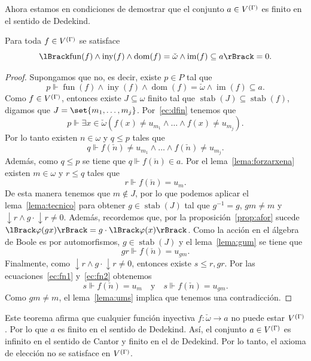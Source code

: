 \documentclass[letterpaper,DIV=15,12pt]{scrartcl}
\DeclarePairedDelimiter{\vb}{\lBrack}{\rBrack}             %
\DeclareMathOperator{\dom}{dom}                            %
\DeclareMathOperator{\im}{im}                              %
\DeclareMathOperator{\stab}{stab}                          %
\DeclareMathOperator{\abajo}{\downarrow}                   %
\DeclareMathOperator{\fun}{fun}                            %
\DeclareMathOperator{\iny}{iny}                            %
\begin{document}
Ahora estamos en condiciones de demostrar que el conjunto \(a\in\mg\) es finito
en el sentido de Dedekind.

\begin{theorem}
    Para toda \(f\in\mg\) se satisface
    \begin{equation*}
        \vb{\fun(f)\land\iny(f)\land\dom(f)=\check{\omega}\land\im(f)\subseteq a}=0.
    \end{equation*}
\end{theorem}
\begin{proof}
    Supongamos que no, es decir, existe \(p\in P\) tal que 
    \begin{equation}
    \label{ec:dfin}
        p\Vdash\fun(f)\land\iny(f)\land\dom(f)=\check{\omega}\land\im(f)\subseteq a.
    \end{equation}
    Como \(f\in\mg\), entonces existe \(J\subseteq\omega\) finito tal que
    \(\stab(J)\subseteq\stab(f)\), digamos que \(J=\set{m_1,\dots,m_j}\).
    Por~\eqref{ec:dfin} tenemos que
    \begin{equation*}
        p\Vdash\exists x\in\check{\omega}(f(x)\ne u_{m_1}\land\dots\land f(x)\ne u_{m_j}).
    \end{equation*}
    Por lo tanto existen \(n\in\omega\) y \(q\leq p\) tales que
    \begin{equation*}
        q\Vdash f(\check{n})\ne u_{m_1}\land\dots\land f(\check{n})\ne u_{m_j}.
    \end{equation*}
    Además, como \(q\leq p\) se tiene que \(q\Vdash f(\check{n})\in a\). Por el
    lema~\ref{lema:forzarxena} existen \(m\in\omega\) y \(r\leq q\) tales que
    \begin{equation}\label{ec:fn1}
        r\Vdash f(\check{n})=u_m.
    \end{equation}
    De esta manera tenemos que \(m\notin J\), por lo que podemos aplicar el 
    lema~\ref{lema:tecnico} para obtener \(g\in\stab(J)\) tal que \(g^{-1}=g\),
    \(gm\ne m\) y \(\abajo r\land g\cdot\abajo r\ne 0\). Además, recordemos que,
    por la proposición~\ref{prop:afor} sucede
    \(\vb{\varphi(gx)}=g\cdot\vb{\varphi(x)}\). Como la acción en el álgebra de
    Boole es por automorfismos, \(g\in\stab(J)\) y el lema~\ref{lema:gum} se
    tiene que
    \begin{equation}\label{ec:fn2}
        gr\Vdash f(\check{n})=u_{gm}.
    \end{equation}
    Finalmente, como \(\abajo r\land g\cdot\abajo r\ne 0\), entonces existe 
    \(s\leq r, gr\). Por las ecuaciones~\eqref{ec:fn1} y~\eqref{ec:fn2}
    obtenemos
    \begin{equation*}
        s\Vdash f(\check{n})=u_m \quad\text{y}\quad
        s\Vdash f(\check{n})=u_{gm}.
    \end{equation*}
    Como \(gm\ne m\), el lema~\ref{lema:ums} implica que tenemos una
    contradicción.
\end{proof}

Este teorema afirma que cualquier función inyectiva 
\(f\colon\check{\omega}\to a\) no puede estar \(\mg\). Por lo que \(a\) es
finito en el sentido de Dedekind. Así, el conjunto \(a\in\mg\) es infinito en el
sentido de Cantor y finito en el de Dedekind. Por lo tanto, el axioma de
elección no se satisface en \(\mg\). 
\end{document}
